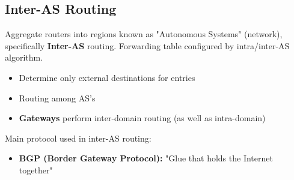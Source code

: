 \documentclass{article}
\begin{document}
\subsection{Inter-AS Routing}
Aggregate routers into regions known as "Autonomous Systems" (network), specifically 
\textbf{Inter-AS} routing. Forwarding table configured by intra/inter-AS algorithm.
\begin{itemize}
    \item Determine only external destinations for entries
    \item Routing among AS's
    \item \textbf{Gateways} perform inter-domain routing (as well as intra-domain)
\end{itemize}
Main protocol used in inter-AS routing:
\begin{itemize}
    \item \textbf{BGP (Border Gateway Protocol):} "Glue that holds the Internet together"
\end{itemize}

\end{document}
